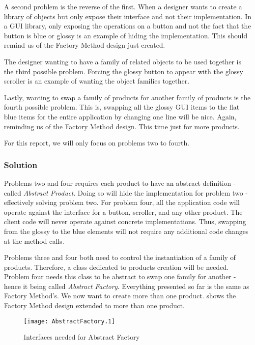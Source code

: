 A second problem is the reverse of the first.
When a designer wants to create a library of objects but only expose their interface and not their implementation.
In a GUI library, only exposing the operations on a button and not the fact that the button is blue or glossy is an example of hiding the implementation.
This should remind us of the Factory Method design just created.

The designer wanting to have a family of related objects to be used together is the third possible problem.
Forcing the glossy button to appear with the glossy scroller is an example of wanting the object families together.

Lastly, wanting to swap a family of products for another family of products is the fourth possible problem.
This is, swapping all the glossy GUI items to the flat blue items for the entire application by changing one line will be nice.
Again, reminding us of the Factory Method design.
This time just for more products.

For this report, we will only focus on problems two to fourth.

\subsubsection{Solution}
Problems two and four requires each product to have an abstract definition - called \textit{Abstract Product}.
Doing so will hide the implementation for problem two - effectively solving problem two.
For problem four, all the application code will operate against the interface for a button, scroller, and any other product.
The client code will never operate against concrete implementations.
Thus, swapping from the glossy to the blue elements will not require any additional code changes at the method calls.

Problems three and four both need to control the instantiation of a family of products.
Therefore, a class dedicated to products creation will be needed.
Problem four needs this class to be abstract to swap one family for another - hence it being called \textit{Abstract Factory}.
Everything presented so far is the same as Factory Method's.
We now want to create more than one product.
 shows the Factory Method design extended to more than one product.

\begin{figure}[h]
	\centering
	\texttt{[image: AbstractFactory.1]}
	\caption{Interfaces needed for Abstract Factory}
	\label{fig:AbstractFactoryInterface}
\end{figure}

